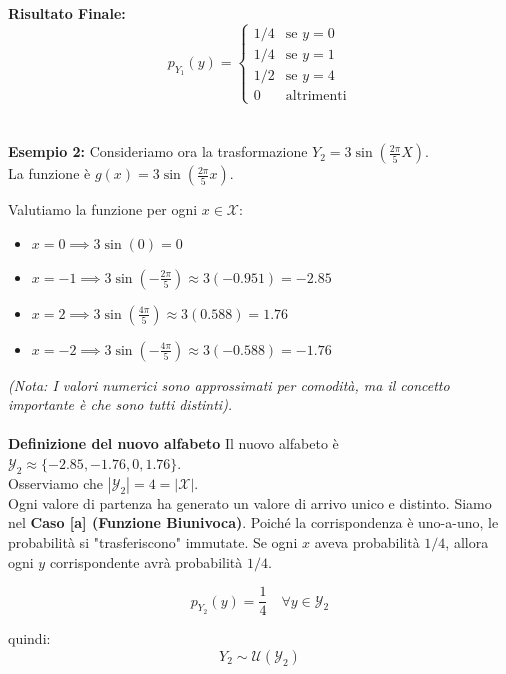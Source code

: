 \textbf{Risultato Finale:}
\begin{equation}
\boxed{
p_{Y_1}(y) = 
\begin{cases} 
1/4 & \text{se } y = 0 \\
1/4 & \text{se } y = 1 \\
1/2 & \text{se } y = 4 \\
0 & \text{altrimenti}
\end{cases}
}
\end{equation}
\\\\
\textbf{Esempio 2:}
Consideriamo ora la trasformazione $Y_2 = 3 \sin\left(\frac{2\pi}{5}X\right)$.
\\La funzione è $g(x) = 3 \sin\left(\frac{2\pi}{5}x\right)$.

Valutiamo la funzione per ogni $x \in \mathcal{X}$:

\begin{itemize}
    \item $x = 0 \implies 3 \sin(0) = 0$
    \item $x = -1 \implies 3 \sin\left(-\frac{2\pi}{5}\right) \approx 3(-0.951) = -2.85$
    \item $x = 2 \implies 3 \sin\left(\frac{4\pi}{5}\right) \approx 3(0.588) = 1.76$
    \item $x = -2 \implies 3 \sin\left(-\frac{4\pi}{5}\right) \approx 3(-0.588) = -1.76$
\end{itemize}
\textit{(Nota: I valori numerici sono approssimati per comodità, ma il concetto importante è che sono tutti distinti).}
\\\\
\textbf{Definizione del nuovo alfabeto}
Il nuovo alfabeto è $\mathcal{Y}_2 \approx \{-2.85, -1.76, 0, 1.76\}$.
\\Osserviamo che $|\mathcal{Y}_2| = 4 = |\mathcal{X}|$.
\\Ogni valore di partenza ha generato un valore di arrivo unico e distinto. Siamo nel \textbf{Caso [a] (Funzione Biunivoca)}.
Poiché la corrispondenza è uno-a-uno, le probabilità si "trasferiscono" immutate. Se ogni $x$ aveva probabilità $1/4$, allora ogni $y$ corrispondente avrà probabilità $1/4$.

\[ p_{Y_2}(y) = \frac{1}{4} \quad \forall y \in \mathcal{Y}_2 \]

quindi: 
\begin{equation}
Y_2 \sim \mathcal{U}(\mathcal{Y}_2)
\end{equation}
